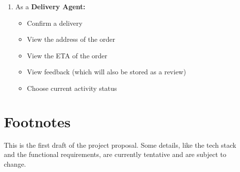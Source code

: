 \documentclass[12pt]{report}
\begin{document}
\begin{enumerate}
        \item As a \textbf{Delivery Agent:}
        \begin{itemize}
            \item Confirm a delivery
            \item View the address of the order
            \item View the ETA of the order
            \item View feedback (which will also be stored as a review)
            \item Choose current activity status
        \end{itemize}
    \end{enumerate}

    \vspace*{150pt}

    \section*{Footnotes}
    This is the first draft of the project proposal.
    Some details, like the tech stack and the functional requirements, are currently tentative and are subject to change.
\end{document}
